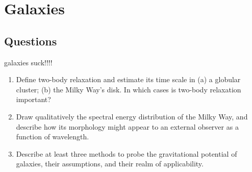 \section{Galaxies}
\subsection{Questions}
galaxies suck!!!!
\begin{enumerate}
\item Define two-body relaxation and estimate its time scale in (a) a globular cluster; (b)
      the Milky Way's disk. In which cases is two-body relaxation important?
\item Draw qualitatively the spectral energy distribution of the Milky Way, and describe
      how its morphology might appear to an external observer as a function of wavelength.
\item Describe at least three methods to probe the gravitational potential of galaxies,
      their assumptions, and their realm of applicability.
\end{enumerate}
